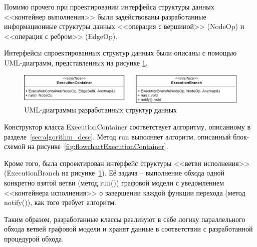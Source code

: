 Помимо прочего при проектировании интерфейса структуры данных <<контейнер выполнения>> были задействованы разработанные информационные структуры данных <<операция с вершиной>> (\textsf{NodeOp}) и <<операция с ребром>> (\textsf{EdgeOp}).

Интерфейсы спроектированных структур данных были описаны с помощью UML-диаграмм, представленных на рисунке \ref{fig:UMLAll}.
\begin{figure}[!ht]
    \centering
    \includegraphics[width=\textwidth]{figures/UML.all.png}
    \caption{UML-диаграммы разработанных структур данных}
    \label{fig:UMLAll}
\end{figure}

Конструктор класса \textsf{ExecutionContainer} соответствует алгоритму, описанному в разделе~\ref{sec:algorithm_desc}. Метод run выполняет алгоритм, описанный блок-схемой на рисунке~\ref{fig:flowchartExecutionContainer}.

Кроме того, была спроектирован интерфейс структуры <<ветви исполнения>> (\textsf{ExecutionBranch} на рисунке~\ref{fig:UMLAll}). Её задача -- выполнение обхода одной конкретно взятой ветви (метод \textsf{run()}) графовой модели с уведомлением <<контейнера исполнения>> о завершении каждой функции перехода (метод \textsf{notify()}), как того требует алгоритм.

Таким образом, разработанные классы реализуют в себе логику параллельного обхода ветвей графовой модели и хранят данные в соответствии с разработанной процедурой обхода.

